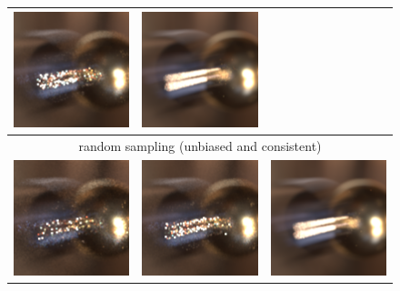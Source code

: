 \begin{figure}
\begin{tabular}{c c c}
  \includegraphics[width=.3\linewidth]{../PBRTOut/pngs/testmb_ball.scene_LD_16_Samps_iter_1__uj.exr.png}&
  \includegraphics[width=.3\linewidth]{../PBRTOut/pngs/testmb_ball.scene_LD_4096_Samps_iter_1__uj.exr.png}\\
\hline
\multicolumn{3}{c}{random sampling (unbiased and consistent)}\\
  \includegraphics[width=.3\linewidth]{../PBRTOut/pngs/testmb_ball.scene_RAND_4_Samps_iter_1__uj.exr.png}&
  \includegraphics[width=.3\linewidth]{../PBRTOut/pngs/testmb_ball.scene_RAND_16_Samps_iter_1__uj.exr.png}&
  \includegraphics[width=.3\linewidth]{../PBRTOut/pngs/testmb_ball.scene_RAND_4096_Samps_iter_1__uj.exr.png} \\

\end{tabular}
\end{figure}
